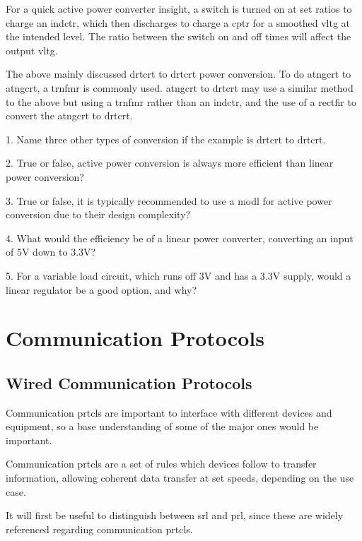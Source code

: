 \documentclass[a4paper,11pt]{report}
\newcommand{\Quiz}[1] %
{
\par\noindent %
\phantomsection %
\todo[inline, color=blue!30]{\textbf{#1}} %
\vspace{1em} %
}
\begin{document}
For a quick active power converter insight, a switch is turned on at set ratios to charge an \gls{indctr}, which then discharges to charge a \gls{cptr} for a smoothed \gls{vltg} at the intended level. The ratio between the switch on and off times will affect the output \gls{vltg}.

The above mainly discussed \gls{drtcrt} to \gls{drtcrt} power conversion. To do \gls{atngcrt} to \gls{atngcrt}, a \gls{trnfmr} is commonly used. \gls{atngcrt} to \gls{drtcrt} may use a similar method to the above but using a \gls{trnfmr} rather than an \gls{indctr}, and the use of a \gls{rectfir} to convert the \gls{atngcrt} to \gls{drtcrt}.

\Quiz{Quiz}

1. Name three other types of conversion if the example is \gls{drtcrt} to \gls{drtcrt}.

2. True or false, active power conversion is always more efficient than linear power conversion?

3. True or false, it is typically recommended to use a \gls{modl} for active power conversion due to their design complexity?

4. What would the efficiency be of a linear power converter, converting an input of 5V down to 3.3V?

5. For a variable load circuit, which runs off 3V and has a 3.3V supply, would a linear regulator be a good option, and why?

\pagebreak

\section{Communication Protocols}

\vspace*{1\baselineskip}

\subsection{Wired Communication Protocols}

Communication \gls{prtcl}s are important to interface with different devices and equipment, so a base understanding of some of the major ones would be important.

Communication \gls{prtcl}s are a set of rules which devices follow to transfer information, allowing coherent data transfer at set speeds, depending on the use case.

It will first be useful to distinguish between \gls{srl} and \gls{prl}, since these are widely referenced regarding communication \gls{prtcl}s.
\end{document}
